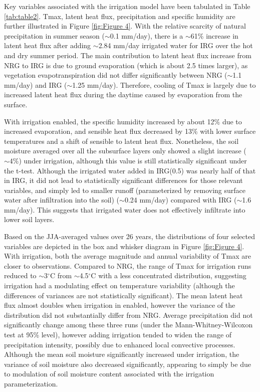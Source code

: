 \documentclass[draft,ms]{agutex}   %
\begin{document}
\begin{article}
Key variables associated with the irrigation model have been tabulated in Table \ref{tab:table2}. Tmax, latent heat flux, precipitation and specific humidity are further illustrated in Figure \ref{fig:Figure 4}. With the relative scarcity of natural precipitation in summer season ($\sim$0.1 mm/day), there is a $\sim$61\% increase in latent heat flux after adding $\sim$2.84 mm/day irrigated water for IRG over the hot and dry summer period. The main contribution to latent heat flux increase from NRG to IRG is due to ground evaporation (which is about 2.5 times larger), as vegetation evapotranspiration did not differ significantly between NRG ($\sim$1.1 mm/day) and IRG ($\sim$1.25 mm/day). Therefore, cooling of Tmax is largely due to increased latent heat flux during the daytime caused by evaporation from the surface. 

With irrigation enabled, the specific humidity increased by about 12$\%$ due to increased evaporation, and sensible heat flux decreased by 13\% with lower surface temperatures and a shift of sensible to latent heat flux. Nonetheless, the soil moisture averaged over all the subsurface layers only showed a slight increase ($\sim4\%$) under irrigation, although this value is still statistically significant under the t-test. Although the irrigated water added in IRG(0.5) was nearly half of that in IRG, it did not lead to statistically significant differences for those relevant variables, and simply led to smaller runoff (parameterized by removing surface water after infiltration into the soil) ($\sim$0.24 mm/day) compared with IRG ($\sim$1.6 mm/day). This suggests that irrigated water does not effectively infiltrate into lower soil layers.

Based on the JJA-averaged values over 26 years, the distributions of four selected variables are depicted in the box and whisker diagram in Figure \ref{fig:Figure 4}. With irrigation, both the average magnitude and annual variability of Tmax are closer to observations. Compared to NRG, the range of Tmax for irrigation runs reduced to $\sim$3$^\circ$C from $\sim$4.5$^\circ$C with a less concentrated distribution, suggesting irrigation had a modulating effect on temperature variability (although the differences of variances are not statistically significant). The mean latent heat flux almost doubles when irrigation in enabled, however the variance of the distribution did not substantially differ from NRG. Average precipitation did not significantly change among these three runs (under the Mann-Whitney-Wilcoxon test at 95\% level), however adding irrigation tended to widen the range of precipitation intensity, possibly due to enhanced local convective processes. Although the mean soil moisture significantly increased under irrigation, the variance of soil moisture also decreased significantly, appearing to simply be due to modulation of soil moisture content associated with the irrigation parameterization.


\end{article}
\end{document}

